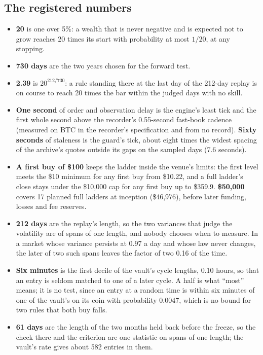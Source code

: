 \documentclass[11pt]{article}
\begin{document}
\subsection{The registered numbers}

\begin{itemize}
  \item \textbf{20} is one over 5\%: a wealth that is never negative and is expected not to grow reaches 20 times its start with probability at most $1/20$, at any stopping.
  \item \textbf{730 days} are the two years chosen for the forward test.
  \item \textbf{2.39} is $20^{212/730}$: a rule standing there at the last day of the 212-day replay is on course to reach 20 times the bar within the judged days with no skill.
  \item \textbf{One second} of order and observation delay is the engine's least tick and the first whole second above the recorder's 0.55-second fast-book cadence (measured on BTC in the recorder's specification and from no record). \textbf{Sixty seconds} of staleness is the guard's tick, about eight times the widest spacing of the archive's quotes outside its gaps on the sampled days (7.6 seconds).
  \item \textbf{A first buy of \$100} keeps the ladder inside the venue's limits: the first level meets the \$10 minimum for any first buy from \$10.22, and a full ladder's close stays under the \$10{,}000 cap for any first buy up to \$359.9. \textbf{\$50{,}000} covers 17 planned full ladders at inception (\$46{,}976), before later funding, losses and fee reserves.
  \item \textbf{212 days} are the replay's length, so the two variances that judge the volatility are of spans of one length, and nobody chooses when to measure. In a market whose variance persists at 0.97 a day and whose law never changes, the later of two such spans leaves the factor of two 0.16 of the time.
  \item \textbf{Six minutes} is the first decile of the vault's cycle lengths, 0.10 hours, so that an entry is seldom matched to one of a later cycle. A half is what ``most'' means; it is no test, since an entry at a random time is within six minutes of one of the vault's on its coin with probability 0.0047, which is no bound for two rules that both buy falls.
  \item \textbf{61 days} are the length of the two months held back before the freeze, so the check there and the criterion are one statistic on spans of one length; the vault's rate gives about 582 entries in them.
\end{itemize}
\end{document}
